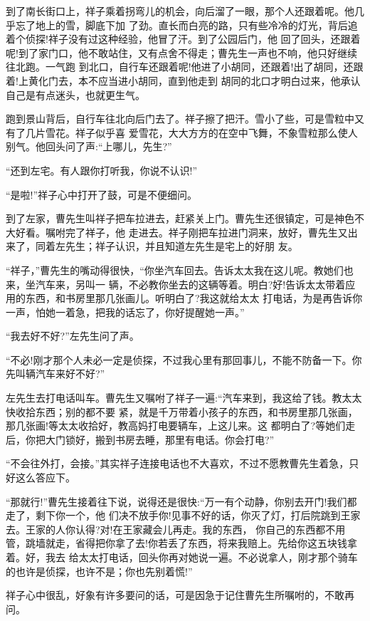 \documentclass[11pt,a4paper,onecolumn]{article}
\begin{document}
到了南长街口上，祥子乘着拐弯儿的机会，向后溜了一眼，那个人还跟着呢。他几乎忘了地上的雪，脚底下加
了劲。直长而白亮的路，只有些冷冷的灯光，背后追着个侦探!祥子没有过这种经验，他冒了汗。到了公园后门，他
回了回头，还跟着呢!到了家门口，他不敢站住，又有点舍不得走；曹先生一声也不响，他只好继续往北跑。一气跑
到北口，自行车还跟着呢!他进了小胡同，还跟着!出了胡同，还跟着!上黄化门去，本不应当进小胡同，直到他走到
胡同的北口才明白过来，他承认自己是有点迷头，也就更生气。

跑到景山背后，自行车往北向后门去了。祥子擦了把汗。雪小了些，可是雪粒中又有了几片雪花。祥子似乎喜
爱雪花，大大方方的在空中飞舞，不象雪粒那么使人别气。他回头问了声:``上哪儿，先生?''

``还到左宅。有人跟你打听我，你说不认识!''

``是啦!''祥子心中打开了鼓，可是不便细问。

到了左家，曹先生叫祥子把车拉进去，赶紧关上门。曹先生还很镇定，可是神色不大好看。嘱咐完了祥子，他
走进去。祥子刚把车拉进门洞来，放好，曹先生又出来了，同着左先生；祥子认识，并且知道左先生是宅上的好朋
友。

``祥子，''曹先生的嘴动得很快，``你坐汽车回去。告诉太太我在这儿呢。教她们也来，坐汽车来，另叫一
辆，不必教你坐去的这辆等着。明白?好!告诉太太带着应用的东西，和书房里那几张画儿。听明白了?我这就给太太
打电话，为是再告诉你一声，怕她一着急，把我的话忘了，你好提醒她一声。''

``我去好不好?''左先生问了声。

``不必!刚才那个人未必一定是侦探，不过我心里有那回事儿，不能不防备一下。你先叫辆汽车来好不好?''

左先生去打电话叫车。曹先生又嘱咐了祥子一遍:``汽车来到，我这给了钱。教太太快收拾东西；别的都不要
紧，就是千万带着小孩子的东西，和书房里那几张画，那几张画!等太太收拾好，教高妈打电要辆车，上这儿来。这
都明白了?等她们走后，你把大门锁好，搬到书房去睡，那里有电话。你会打电?''

``不会往外打，会接。''其实祥子连接电话也不大喜欢，不过不愿教曹先生着急，只好这么答应下。

``那就行!''曹先生接着往下说，说得还是很快:``万一有个动静，你别去开门!我们都走了，剩下你一个，他
们决不放手你!见事不好的话，你灭了灯，打后院跳到王家去。王家的人你认得?对!在王家藏会儿再走。我的东西，
你自己的东西都不用管，跳墙就走，省得把你拿了去!你若丢了东西，将来我赔上。先给你这五块钱拿着。好，我去
给太太打电话，回头你再对她说一遍。不必说拿人，刚才那个骑车的也许是侦探，也许不是；你也先别着慌!''

祥子心中很乱，好象有许多要问的话，可是因急于记住曹先生所嘱咐的，不敢再问。
\end{document}
